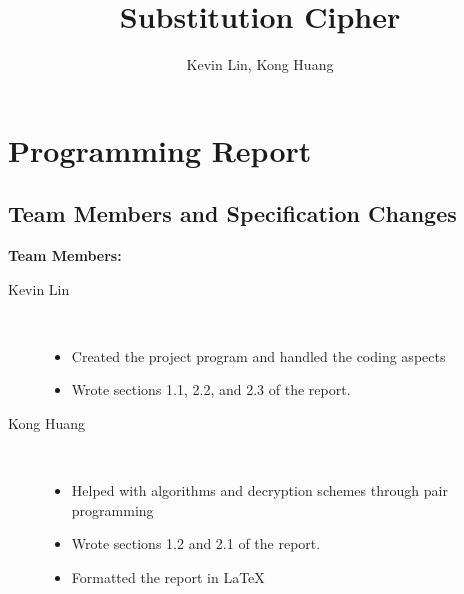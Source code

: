 \documentclass[a4paper,twoside,10pt]{report}
\begin{document}
\pagestyle{empty} %



\title{Substitution Cipher}
\author{Kevin Lin, Kong Huang}
\maketitle



\tableofcontents %
\cleardoublepage %

\pagestyle{plain} %


\chapter{Programming Report}\label{report}

\section{Team Members and Specification Changes}\label{members}
\noindent
\textbf{Team Members:}
\begin{description}
	\item[Kevin Lin] \hfill \\
	\vspace{-5mm}
	\begin{itemize}
		\item Created the project program and handled the coding aspects
		\item Wrote sections 1.1, 2.2, and 2.3 of the report.
	\end{itemize}
	\item[Kong Huang] \hfill \\
	\vspace{-5mm}
	\begin{itemize}
		\item Helped with algorithms and decryption schemes through pair programming
		\item Wrote sections 1.2 and 2.1 of the report.
		\item Formatted the report in LaTeX
	\end{itemize}
\end{description}
\end{document}
